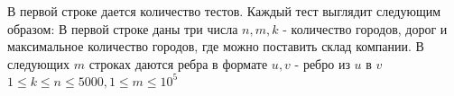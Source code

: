 В первой строке дается количество тестов.
Каждый тест выглядит следующим образом:
В первой строке даны три числа $n, m, k$ - количество городов, дорог и максимальное количество городов, где можно поставить склад компании.
В следующих $m$ строках даются ребра в формате $u, v$ - ребро из $u$ в $v$
$1 \le k \le n \le 5000, 1 \le m \le 10^5$